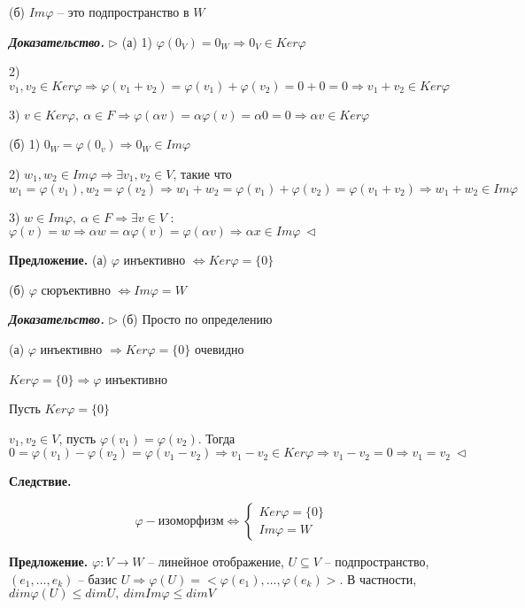 (б) $Im \varphi$ -- это подпространство в $W$

\bigskip
\textbf{\textit{Доказательство.}} $\rhd$ (а) 1) $\varphi (0_V) = 0_W \Rightarrow 0_V \in Ker \varphi$

2) $v_1, v_2 \in Ker \varphi \Rightarrow \varphi (v_1 + v_2) = \varphi(v_1) + \varphi(v_2) = 0 + 0 = 0 \Rightarrow v_1 + v_2 \in Ker \varphi$

3) $v \in Ker \varphi, \ \alpha \in F \Rightarrow \varphi (\alpha v) = \alpha \varphi (v) = \alpha 0 = 0 \Rightarrow \alpha v \in Ker \varphi$

\bigskip
(б) 1) $0_W = \varphi (0_v) \Rightarrow 0_W \in Im \varphi$

2) $w_1, w_2 \in Im \varphi \Rightarrow \exists v_1, v_2 \in V$, такие что $w_1 = \varphi (v_1), w_2 = \varphi(v_2) \Rightarrow w_1 + w_2 = \varphi (v_1) + \varphi (v_2) = \varphi (v_1 + v_2) \Rightarrow w_1 + w_2 \in Im \varphi$

3) $w \in Im \varphi, \ \alpha \in F \Rightarrow \exists v \in V$ : $\varphi (v) = w \Rightarrow \alpha w = \alpha \varphi (v) = \varphi (\alpha v) \Rightarrow \alpha x \in Im \varphi \ \lhd$

\bigskip
\textbf{Предложение.} (а) $\varphi$ инъективно $\Leftrightarrow Ker \varphi = \{0\}$

(б) $\varphi$ сюръективно $\Leftrightarrow Im \varphi = W$

\bigskip
\textbf{\textit{Доказательство.}} $\rhd$ (б) Просто по определению

(а) $\varphi$ инъективно $\Rightarrow Ker \varphi = \{0\}$ очевидно

$Ker \varphi = \{0\} \Rightarrow \varphi$ инъективно

Пусть $Ker \varphi = \{0\}$

$v_1, v_2 \in V$, пусть $\varphi (v_1) = \varphi(v_2)$. Тогда $0 = \varphi(v_1) - \varphi(v_2) = \varphi(v_1 - v_2) \Rightarrow v_1 - v_2 \in Ker \varphi \Rightarrow v_1 - v_2 = 0 \Rightarrow v_1 = v_2 \ \lhd$

\bigskip
\textbf{Следствие.}  

\begin{equation*}
	\varphi - изоморфизм \Leftrightarrow \begin{cases}
		Ker \varphi = \{0\} \\
		Im \varphi = W
	\end{cases}
\end{equation*}

\bigskip
\textbf{Предложение.} $\varphi : V \rightarrow W$ -- линейное отображение, $U \subseteq V$ -- подпространство, $(e_1, \dots, e_k)$ -- базис $U \Rightarrow \varphi (U) = < \varphi(e_1), \dots, \varphi (e_k)>$. В частности, $dim \varphi (U) \leq dim U, \ dim Im \varphi \leq dim V$

